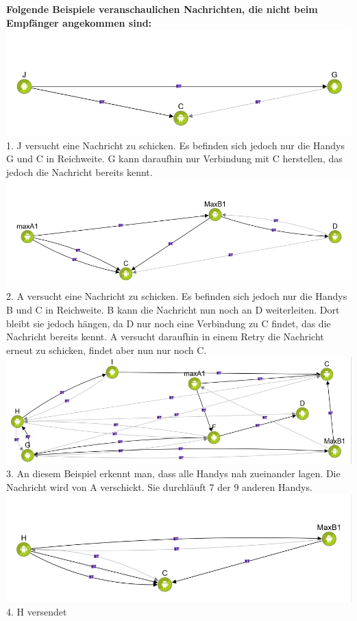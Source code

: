 \textbf{Folgende Beispiele veranschaulichen Nachrichten, die nicht beim
Empfänger angekommen sind:}
\includegraphics{belege/grosstests/Bilder/Miserfolg6.jpg} 1. J versucht
eine Nachricht zu schicken. Es befinden sich jedoch nur die Handys G und
C in Reichweite. G kann daraufhin nur Verbindung mit C herstellen, das
jedoch die Nachricht bereits kennt.
\includegraphics{belege/grosstests/Bilder/Miserfolg5.jpg} 2. A versucht
eine Nachricht zu schicken. Es befinden sich jedoch nur die Handys B und
C in Reichweite. B kann die Nachricht nun noch an D weiterleiten. Dort
bleibt sie jedoch hängen, da D nur noch eine Verbindung zu C findet, das
die Nachricht bereits kennt. A versucht daraufhin in einem Retry die
Nachricht erneut zu schicken, findet aber nun nur noch C.
\includegraphics{belege/grosstests/Bilder/Miserfolg4.jpg} 3. An diesem
Beispiel erkennt man, dass alle Handys nah zueinander lagen. Die
Nachricht wird von A verschickt. Sie durchläuft 7 der 9 anderen Handys.
\includegraphics{belege/grosstests/Bilder/Miserfolg3.jpg} 4. H versendet
